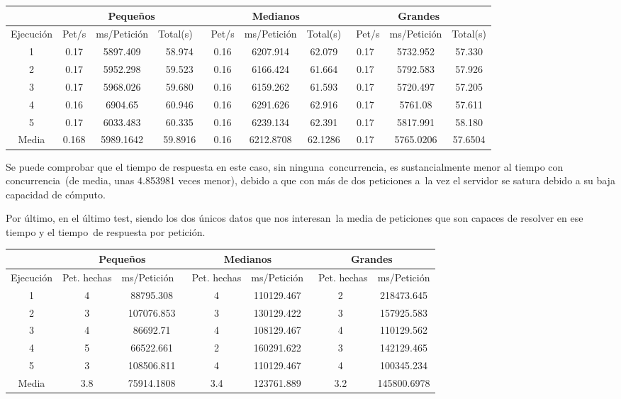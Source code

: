 \documentclass[11pt,twoside,a4paper]{book}
\begin{document}
\begin{center}
\small
\begin{tabular}{ |c|c|c|c|c|c|c|c|c|c| }
 \hline
  & \multicolumn{3}{|c}{Pequeños} & \multicolumn{3}{|c|}{Medianos} & \multicolumn{3}{|c|}{Grandes} \\
 \hline
 Ejecución & Pet/s & ms/Petición & Total(s) \
 & Pet/s & ms/Petición & Total(s) &\
 Pet/s & ms/Petición & Total(s) \\
 \hline
 1 & 0.17 & 5897.409 & 58.974 & 0.16 & 6207.914 & 62.079 & 0.17 & 5732.952 & 57.330 \\
 \hline
 2 & 0.17 & 5952.298 & 59.523 & 0.16 & 6166.424 & 61.664 & 0.17 & 5792.583 & 57.926 \\
 \hline
 3 & 0.17 & 5968.026 & 59.680 & 0.16 & 6159.262 & 61.593 & 0.17 & 5720.497 & 57.205 \\
 \hline
 4 & 0.16 & 6904.65 & 60.946 & 0.16 & 6291.626 & 62.916 & 0.17 & 5761.08 & 57.611 \\
 \hline
 5 & 0.17 & 6033.483 & 60.335 & 0.16 & 6239.134 & 62.391 & 0.17 & 5817.991 & 58.180 \\
 \hline
 Media & 0.168 & 5989.1642 & 59.8916 & 0.16 & 6212.8708 & 62.1286 & 0.17 & 5765.0206 & 57.6504 \\
 \hline
\end{tabular}
\end{center}

Se puede comprobar que el tiempo de respuesta en este caso, sin ninguna\break\
concurrencia, es sustancialmente menor al tiempo con concurrencia\
(de media, unas 4.853981 veces menor), debido a que con más de dos peticiones a\
la vez el servidor se satura debido a su baja capacidad de cómputo. \newline

Por último, en el último test, siendo los dos únicos datos que nos interesan\
la media de peticiones que son capaces de resolver en ese tiempo y el tiempo\
de respuesta por petición.

\begin{center}
\small
\begin{tabular}{ |c|c|c|c|c|c|c| }
 \hline
  & \multicolumn{2}{|c}{Pequeños} & \multicolumn{2}{|c|}{Medianos} & \multicolumn{2}{c|}{Grandes} \\
 \hline
 Ejecución & Pet. hechas & ms/Petición \
 & Pet. hechas & ms/Petición &\
 Pet. hechas & ms/Petición \\
 \hline
 1 & 4 & 88795.308 & 4 & 110129.467 & 2 & 218473.645 \\
 \hline
 2 & 3 & 107076.853 & 3 & 130129.422 & 3 & 157925.583 \\
 \hline
 3 & 4 & 86692.71 & 4 & 108129.467 & 4 & 110129.562 \\
 \hline
 4 & 5 & 66522.661 & 2 & 160291.622 & 3 & 142129.465 \\
 \hline
 5 & 3 & 108506.811 & 4 & 110129.467 & 4 & 100345.234 \\
 \hline
 Media & 3.8 & 75914.1808 & 3.4 & 123761.889 & 3.2 & 145800.6978 \\
 \hline
\end{tabular}
\end{center}
\end{document}
